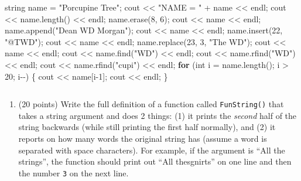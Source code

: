 \documentclass[
]{article}
\newenvironment{Shaded}{}{}
\newcommand{\ControlFlowTok}[1]{\textcolor[rgb]{0.00,0.44,0.13}{\textbf{#1}}}
\newcommand{\DataTypeTok}[1]{\textcolor[rgb]{0.56,0.13,0.00}{#1}}
\newcommand{\DecValTok}[1]{\textcolor[rgb]{0.25,0.63,0.44}{#1}}
\newcommand{\NormalTok}[1]{#1}
\newcommand{\StringTok}[1]{\textcolor[rgb]{0.25,0.44,0.63}{#1}}
\providecommand{\tightlist}{%
  \setlength{\itemsep}{0pt}\setlength{\parskip}{0pt}}
\begin{document}
\begin{Shaded}
\begin{Highlighting}[]
\NormalTok{string name = }\StringTok{"Porcupine Tree"}\NormalTok{; }
\NormalTok{cout \textless{}\textless{} }\StringTok{"NAME = "}\NormalTok{ + name \textless{}\textless{} endl; }
\NormalTok{cout \textless{}\textless{} name.length() \textless{}\textless{} endl; }
\NormalTok{name.erase(}\DecValTok{8}\NormalTok{, }\DecValTok{6}\NormalTok{);}
\NormalTok{cout \textless{}\textless{} name \textless{}\textless{} endl;}
\NormalTok{name.append(}\StringTok{"Dean WD Morgan"}\NormalTok{);}
\NormalTok{cout \textless{}\textless{} name \textless{}\textless{} endl;}
\NormalTok{name.insert(}\DecValTok{22}\NormalTok{, }\StringTok{"@TWD"}\NormalTok{);}
\NormalTok{cout \textless{}\textless{} name \textless{}\textless{} endl;}
\NormalTok{name.replace(}\DecValTok{23}\NormalTok{, }\DecValTok{3}\NormalTok{, }\StringTok{"The WD"}\NormalTok{);}
\NormalTok{cout \textless{}\textless{} name \textless{}\textless{} endl;}
\NormalTok{cout \textless{}\textless{} name.find(}\StringTok{"WD"}\NormalTok{) \textless{}\textless{} endl;}
\NormalTok{cout \textless{}\textless{} name.rfind(}\StringTok{"WD"}\NormalTok{) \textless{}\textless{} endl;}
\NormalTok{cout \textless{}\textless{} name.rfind(}\StringTok{"cupi"}\NormalTok{) \textless{}\textless{} endl;}
\ControlFlowTok{for}\NormalTok{ (}\DataTypeTok{int}\NormalTok{ i = name.length(); i \textgreater{} }\DecValTok{20}\NormalTok{; i{-}{-}) \{}
\NormalTok{   cout \textless{}\textless{} name[i{-}}\DecValTok{1}\NormalTok{];}
\NormalTok{   cout \textless{}\textless{} endl;}
\NormalTok{\}}
\end{Highlighting}
\end{Shaded}

\begin{verbatim}
\end{verbatim}

\pagebreak

\begin{enumerate}
\def\labelenumi{\arabic{enumi}.}
\setcounter{enumi}{4}
\tightlist
\item
  (20 points) Write the full definition of a function called
  \texttt{FunString()} that takes a string argument and does 2 things:
  (1) it prints the \emph{second} half of the string backwards (while
  still printing the first half normally), and (2) it reports on how
  many words the original string has (assume a word is separated with
  space characters). For example, if the argument is ``All the
  strings'', the function should print out ``All thesgnirts'' on one
  line and then the number \texttt{3} on the next line.
\end{enumerate}
\end{document}
